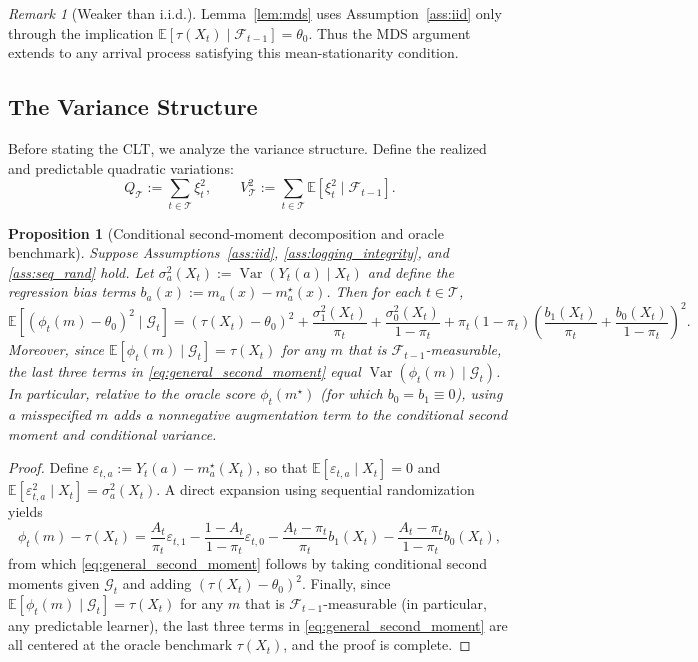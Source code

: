 \documentclass[11pt]{article}
\numberwithin{equation}{section}
\theoremstyle{plain}
\newtheorem{proposition}[theorem]{Proposition}
\theoremstyle{definition}
\theoremstyle{remark}
\newtheorem{remark}[theorem]{Remark}
\newcommand{\E}{\mathbb{E}}
\newcommand{\Var}{\operatorname{Var}}
\newcommand{\cF}{\mathcal{F}}
\newcommand{\cG}{\mathcal{G}}
\newcommand{\pit}{\pi_t}
\begin{document}
\begin{remark}[Weaker than i.i.d.]\label{rem:weaker_iid}
Lemma~\ref{lem:mds} uses Assumption~\ref{ass:iid} only through the implication $\E[\tau(X_t)\mid \cF_{t-1}]=\theta_0$.
Thus the MDS argument extends to any arrival process satisfying this mean-stationarity condition.
\end{remark}

\subsection{The Variance Structure}\label{sec:variance_structure}

Before stating the CLT, we analyze the variance structure. Define the realized and predictable quadratic variations:
\begin{equation}\label{eq:quadratic_variations}
Q_{\mathcal{T}} := \sum_{t\in\mathcal{T}} \xi_t^2, \qquad
V_{\mathcal{T}}^2 := \sum_{t\in\mathcal{T}} \E[\xi_t^2 \mid \cF_{t-1}].
\end{equation}

\begin{proposition}[Conditional second-moment decomposition and oracle benchmark]\label{prop:var_decomp}
Suppose Assumptions~\ref{ass:iid}, \ref{ass:logging_integrity}, and \ref{ass:seq_rand} hold. Let $\sigma_a^2(X_t):=\Var(Y_t(a)\mid X_t)$ and define the regression bias terms $b_a(x):=m_a(x)-m_a^\star(x)$. Then for each $t\in\mathcal{T}$,
\begin{equation}\label{eq:general_second_moment}
\E[(\phi_t(m)-\theta_0)^2 \mid \cG_t]
=
(\tau(X_t)-\theta_0)^2
+\frac{\sigma_1^2(X_t)}{\pit}
+\frac{\sigma_0^2(X_t)}{1-\pit}
+\pit(1-\pit)\left(\frac{b_1(X_t)}{\pit}+\frac{b_0(X_t)}{1-\pit}\right)^2.
\end{equation}
Moreover, since $\E[\phi_t(m)\mid \cG_t]=\tau(X_t)$ for any $m$ that is $\cF_{t-1}$-measurable, the last three terms in \eqref{eq:general_second_moment} equal $\Var(\phi_t(m)\mid \cG_t)$. In particular, relative to the oracle score $\phi_t(m^\star)$ (for which $b_0=b_1\equiv 0$), using a misspecified $m$ adds a nonnegative augmentation term to the conditional second moment and conditional variance.
\end{proposition}
\begin{proof}
Define $\varepsilon_{t,a}:=Y_t(a)-m_a^\star(X_t)$, so that $\E[\varepsilon_{t,a}\mid X_t]=0$ and $\E[\varepsilon_{t,a}^2\mid X_t]=\sigma_a^2(X_t)$. A direct expansion using sequential randomization yields
\[
\phi_t(m)-\tau(X_t)
=
\frac{A_t}{\pit}\varepsilon_{t,1}-\frac{1-A_t}{1-\pit}\varepsilon_{t,0}
-\frac{A_t-\pit}{\pit}b_1(X_t)-\frac{A_t-\pit}{1-\pit}b_0(X_t),
\]
from which \eqref{eq:general_second_moment} follows by taking conditional second moments given $\cG_t$ and adding $(\tau(X_t)-\theta_0)^2$. Finally, since $\E[\phi_t(m)\mid \cG_t]=\tau(X_t)$ for any $m$ that is $\cF_{t-1}$-measurable (in particular, any predictable learner), the last three terms in \eqref{eq:general_second_moment} are all centered at the oracle benchmark $\tau(X_t)$, and the proof is complete.
\end{proof}
\end{document}

